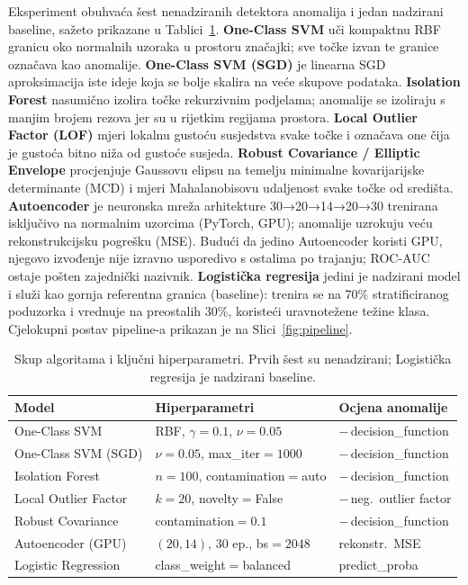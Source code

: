 \documentclass[letterpaper, 10pt, conference]{ieeeconf}
\begin{document}
Eksperiment obuhvaća šest nenadziranih detektora anomalija i jedan nadzirani baseline, sažeto prikazane u Tablici~\ref{tab:lineup}.
\textbf{One-Class SVM} \cite{ocsvm} uči kompaktnu RBF granicu oko normalnih uzoraka u prostoru značajki; sve točke izvan te granice označava kao anomalije.
\textbf{One-Class SVM (SGD)} je linearna SGD aproksimacija iste ideje koja se bolje skalira na veće skupove podataka.
\textbf{Isolation Forest} \cite{iforest} nasumično izolira točke rekurzivnim podjelama; anomalije se izoliraju s manjim brojem rezova jer su u rijetkim regijama prostora.
\textbf{Local Outlier Factor (LOF)} \cite{lof} mjeri lokalnu gustoću susjedstva svake točke i označava one čija je gustoća bitno niža od gustoće susjeda.
\textbf{Robust Covariance / Elliptic Envelope} \cite{mcd} procjenjuje Gaussovu elipsu na temelju minimalne kovarijarijske determinante (MCD) i mjeri Mahalanobisovu udaljenost svake točke od središta.
\textbf{Autoencoder} \cite{pytorch} je neuronska mreža arhitekture 30→20→14→20→30 trenirana isključivo na normalnim uzorcima (PyTorch, GPU); anomalije uzrokuju veću rekonstrukcijsku pogrešku (MSE). Budući da jedino Autoencoder koristi GPU, njegovo izvođenje nije izravno usporedivo s ostalima po trajanju; ROC-AUC ostaje pošten zajednički nazivnik.
\textbf{Logistička regresija} \cite{sklearn} jedini je nadzirani model i služi kao gornja referentna granica (baseline): trenira se na 70\% stratificiranog poduzorka i vrednuje na preostalih 30\%, koristeći uravnotežene težine klasa.
Cjelokupni postav pipeline-a prikazan je na Slici~\ref{fig:pipeline}.

\begin{table}[t]
\caption{Skup algoritama i ključni hiperparametri. Prvih šest su nenadzirani; Logistička regresija je nadzirani baseline.}
\label{tab:lineup}
\centering
\begin{tabular}{@{}lll@{}}
\toprule
Model & Hiperparametri & Ocjena anomalije \\
\midrule
One-Class SVM        & RBF, $\gamma{=}0.1$, $\nu{=}0.05$        & $-$\,decision\_function \\
One-Class SVM (SGD)  & $\nu{=}0.05$, max\_iter${=}1000$         & $-$\,decision\_function \\
Isolation Forest     & $n{=}100$, contamination${=}$auto       & $-$\,decision\_function \\
Local Outlier Factor & $k{=}20$, novelty${=}$False             & $-$\,neg.\ outlier factor \\
Robust Covariance    & contamination${=}0.1$                   & $-$\,decision\_function \\
Autoencoder (GPU)    & $(20,14)$, 30 ep., bs${=}2048$          & rekonstr.\ MSE \\
Logistic Regression  & class\_weight${=}$balanced              & predict\_proba \\
\bottomrule
\end{tabular}
\end{table}
\end{document}
